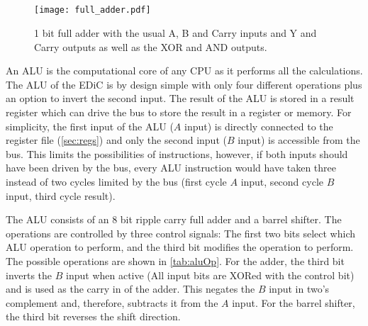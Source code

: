 \subsection{}\label{sec:alu}
\begin{figure}[t]
  \centering
  \texttt{[image: full\_adder.pdf]}
  \caption{1 bit full adder with the usual A, B and Carry inputs and Y and Carry outputs as well as the XOR and AND outputs.}
  \label{fig:full_adder}
\end{figure}
An \gls{ALU} is the computational core of any \gls{CPU} as it performs all the calculations.
The \gls{ALU} of the \gls{EDiC} is by design simple with only four different operations plus an option to invert the second input.
The result of the \gls{ALU} is stored in a result register which can drive the bus to store the result in a register or memory.
For simplicity, the first input of the \gls{ALU} ($A$ input) is directly connected to the register file (\cref{sec:regs}) and only the second input ($B$ input) is accessible from the bus.
This limits the possibilities of instructions, however, if both inputs should have been driven by the bus, every \gls{ALU} instruction would have taken three instead of two cycles limited by the bus (first cycle $A$ input, second cycle $B$ input, third cycle result).

The \gls{ALU} consists of an 8 bit ripple carry full adder and a barrel shifter.
The operations are controlled by three control signals: The first two bits select which \gls{ALU} operation to perform, and the third bit modifies the operation to perform.
The possible operations are shown in \cref{tab:aluOp}.
For the adder, the third bit inverts the $B$ input when active (All input bits are XORed with the control bit) and is used as the carry in of the adder.
This negates the $B$ input in two's complement and, therefore, subtracts it from the $A$ input.
For the barrel shifter, the third bit reverses the shift direction.

